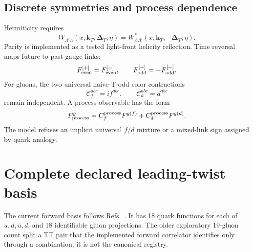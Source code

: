 \documentclass[11pt]{article}
\newcommand{\kT}{\bm{k}_{T}}
\newcommand{\DT}{\bm{\Delta}_{T}}
\begin{document}
\subsection{Discrete symmetries and process dependence}

Hermiticity requires
\begin{equation}
W_{\Lambda'\Lambda}(x,\kT,\DT;\eta)
=W_{\Lambda\Lambda'}^\ast(x,\kT,-\DT;\eta).
\label{eq:hermiticity}
\end{equation}
Parity is implemented as a tested light-front helicity reflection.  Time
reversal maps future to past gauge links:
\begin{equation}
F_{\rm even}^{[+]}=F_{\rm even}^{[-]},\qquad
F_{\rm odd}^{[+]}=-F_{\rm odd}^{[-]}.
\label{eq:link-reversal}
\end{equation}
For gluons, the two universal naive-T-odd color contractions
\begin{equation}
\mathcal C_f^{abc}=if^{abc},\qquad
\mathcal C_d^{abc}=d^{abc}
\label{eq:fd}
\end{equation}
remain independent.  A process observable has the form
\begin{equation}
F_{\rm process}^g=C_f^{\rm process}F^{g(f)}
                 +C_d^{\rm process}F^{g(d)}.
\label{eq:color-combination}
\end{equation}
The model refuses an implicit universal \(f/d\) mixture or a mixed-link
sign assigned by quark analogy.

\section{Complete declared leading-twist basis}
\label{sec:basis}

The current forward basis follows
Refs.~\cite{Spin1Quark2016,KumanoSong2021,Boer2016}.  It has 18 quark functions for each of
\(u,d,\bar u,\bar d\), and 18 identifiable gluon projections.  The older
exploratory 19-gluon count split a TT pair that the implemented forward
correlator identifies only through a combination; it is not the canonical
registry.
\end{document}
